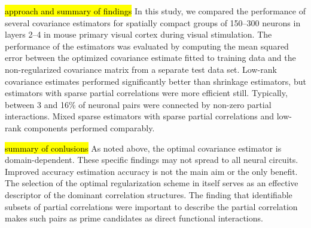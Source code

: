 \hl{\tiny approach and summary of findings} In this study, we compared the performance of several covariance estimators for spatially compact groups of 150--300 neurons in layers 2--4 in mouse primary visual cortex during visual stimulation.   The performance of the estimators was evaluated by computing the mean squared error between the optimized covariance estimate fitted to training data and the non-regularized covariance matrix from a separate test data set.  Low-rank covariance estimates performed significantly better than shrinkage estimators, but estimators with sparse partial correlations were more efficient still. Typically, between 3 and 16\% of neuronal pairs were connected by non-zero partial interactions.  Mixed sparse estimators with sparse partial correlations and low-rank components performed comparably. 

\hl{\tiny summary of conlusions} As noted above, the optimal covariance estimator is domain-dependent. These specific findings may not spread to all neural circuits.
Improved accuracy estimation accuracy is not the main aim or the only benefit.  
The selection of the optimal regularization scheme in itself serves as an effective descriptor of the dominant correlation structures. The finding that identifiable subsets of partial correlations were important to describe the partial correlation makes such pairs as prime candidates as direct functional interactions.